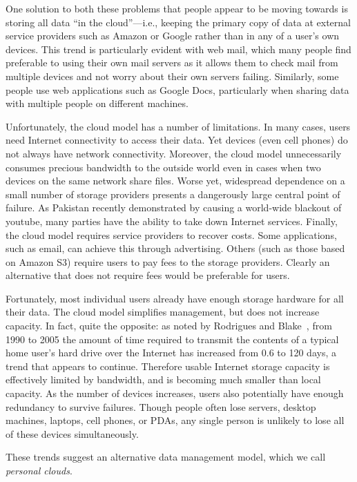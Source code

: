 One solution to both these problems that people appear to be moving
towards is storing all data ``in the cloud''---i.e., keeping the
primary copy of data at external service providers such as Amazon or
Google rather than in any of a user's own devices.  This trend is
particularly evident with web mail, which many people find preferable
to using their own mail servers as it allows them to check mail from
multiple devices and not worry about their own servers failing.
Similarly, some people use web applications such as Google Docs,
particularly when sharing data with multiple people on different
machines.

Unfortunately, the cloud model has a number of limitations.  In many
cases, users need Internet connectivity to access their data.  Yet
devices (even cell phones) do not always have network connectivity.
Moreover, the cloud model unnecessarily consumes precious bandwidth to
the outside world even in cases when two devices on the same network
share files.  Worse yet, widespread dependence on a small number of
storage providers presents a dangerously large central point of
failure.  As Pakistan recently demonstrated by causing a world-wide
blackout of youtube, many parties have the ability to take down
Internet services.  Finally, the cloud model requires service
providers to recover costs.  Some applications, such as email, can
achieve this through advertising.  Others (such as those based on
Amazon S3) require users to pay fees to the storage providers.
Clearly an alternative that does not require fees would be preferable
for users.

Fortunately, most individual users already have enough storage
hardware for all their data.  The cloud model simplifies management,
but does not increase capacity.  In fact, quite the opposite:  as
noted by Rodrigues and Blake~\cite{rodrigues:multi-hop}, from 1990 to
2005 the amount of time required to transmit the contents of a typical
home user's hard drive over the Internet has increased from 0.6 to 120
days, a trend that appears to continue.  Therefore usable Internet
storage capacity is effectively limited by bandwidth, and is becoming
much smaller than local capacity.  As the number of devices increases,
users also potentially have enough redundancy to survive failures.
Though people often lose servers, desktop machines, laptops, cell
phones, or PDAs, any single person is unlikely to lose all of these
devices simultaneously.

These trends suggest an alternative data management model, which we
call \emph{personal clouds}.

